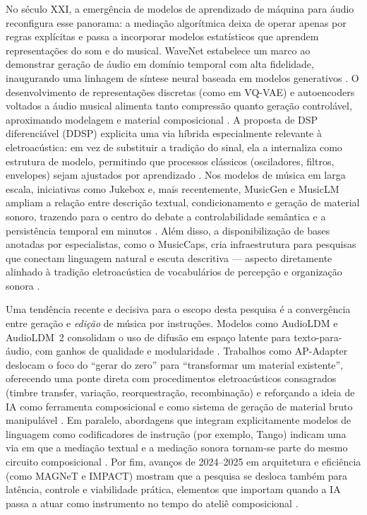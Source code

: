 No século XXI, a emergência de modelos de aprendizado de máquina para áudio reconfigura esse panorama: a mediação algorítmica deixa de operar apenas por regras explícitas e passa a incorporar modelos estatísticos que aprendem representações do som e do musical. WaveNet estabelece um marco ao demonstrar geração de áudio em domínio temporal com alta fidelidade, inaugurando uma linhagem de síntese neural baseada em modelos generativos \cite{oord2016wavenet}. O desenvolvimento de representações discretas (como em VQ-VAE) e autoencoders voltados a áudio musical alimenta tanto compressão quanto geração controlável, aproximando modelagem e material composicional \cite{oord2017vqvae,engel2017nsynth}. A proposta de DSP diferenciável (DDSP) explicita uma via híbrida especialmente relevante à eletroacústica: em vez de substituir a tradição do sinal, ela a internaliza como estrutura de modelo, permitindo que processos clássicos (osciladores, filtros, envelopes) sejam ajustados por aprendizado \cite{engel2020ddsp}. Nos modelos de música em larga escala, iniciativas como Jukebox e, mais recentemente, MusicGen e MusicLM ampliam a relação entre descrição textual, condicionamento e geração de material sonoro, trazendo para o centro do debate a controlabilidade semântica e a persistência temporal em minutos \cite{dhariwal2020jukebox,copet2023musicgen,agostinelli2023musiclm}. Além disso, a disponibilização de bases anotadas por especialistas, como o MusicCaps, cria infraestrutura para pesquisas que conectam linguagem natural e escuta descritiva --- aspecto diretamente alinhado à tradição eletroacústica de vocabulários de percepção e organização sonora \cite{musiccaps2023}.

Uma tendência recente e decisiva para o escopo desta pesquisa é a convergência entre geração e \emph{edição} de música por instruções. Modelos como AudioLDM e AudioLDM~2 consolidam o uso de difusão em espaço latente para texto-para-áudio, com ganhos de qualidade e modularidade \cite{liu2023audioldm,liu2023audioldm2}. Trabalhos como AP-Adapter deslocam o foco do “gerar do zero” para “transformar um material existente”, oferecendo uma ponte direta com procedimentos eletroacústicos consagrados (timbre transfer, variação, reorquestração, recombinação) e reforçando a ideia de IA como ferramenta composicional e como sistema de geração de material bruto manipulável \cite{tsai2024apadapter}. Em paralelo, abordagens que integram explicitamente modelos de linguagem como codificadores de instrução (por exemplo, Tango) indicam uma via em que a mediação textual e a mediação sonora tornam-se parte do mesmo circuito composicional \cite{ghosal2023tango}. Por fim, avanços de 2024--2025 em arquitetura e eficiência (como MAGNeT e IMPACT) mostram que a pesquisa se desloca também para latência, controle e viabilidade prática, elementos que importam quando a IA passa a atuar como instrumento no tempo do ateliê composicional \cite{ziv2024magnet,huang2025impact}.

